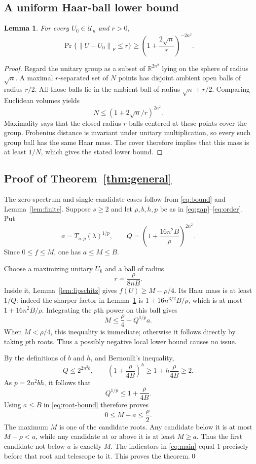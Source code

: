 \documentclass[11pt]{article}
\newcommand{\U}{\mathcal U}
\newcommand{\R}{\mathbb R}
\newcommand{\norm}[1]{\left\lVert#1\right\rVert}
\newtheorem{lemma}[theorem]{Lemma}
\theoremstyle{definition}\newtheorem{definition}[theorem]{Definition}
\theoremstyle{remark}\newtheorem{remark}[theorem]{Remark}
\begin{document}
\subsection{A uniform Haar-ball lower bound}
\begin{lemma}\label{lem:ball}
For every $U_0\in\U_n$ and $r>0$,
\[
 \Pr\{\norm{U-U_0}_F\leq r\}
 \geq\left(1+\frac{2\sqrt n}{r}\right)^{-2n^2}.
\]
\end{lemma}
\begin{proof}
Regard the unitary group as a subset of $\R^{2n^2}$ lying on the sphere of radius $\sqrt n$. A maximal $r$-separated set of $N$ points has disjoint ambient open balls of radius $r/2$. All those balls lie in the ambient ball of radius $\sqrt n+r/2$. Comparing Euclidean volumes yields
\[
 N\leq(1+2\sqrt n/r)^{2n^2}.
\]
Maximality says that the closed radius-$r$ balls centered at these points cover the group. Frobenius distance is invariant under unitary multiplication, so every such group ball has the same Haar mass. The cover therefore implies that this mass is at least $1/N$, which gives the stated lower bound.
\end{proof}

\subsection{Proof of Theorem~\ref{thm:general}}
The zero-spectrum and single-candidate cases follow from \eqref{eq:bound} and Lemma~\ref{lem:finite}. Suppose $s\geq2$ and let $\rho,b,h,p$ be as in \eqref{eq:gap}--\eqref{eq:order}. Put
\[
 a=T_{n,p}(\lambda)^{1/p},\qquad
 Q=\left(1+\frac{16n^2B}{\rho}\right)^{2n^2}.
\]
Since $0\leq f\leq M$, one has $a\leq M\leq B$.

Choose a maximizing unitary $U_0$ and a ball of radius
\[
 r=\frac{\rho}{8nB}.
\]
Inside it, Lemma~\ref{lem:lipschitz} gives $f(U)\geq M-\rho/4$. Its Haar mass is at least $1/Q$: indeed the sharper factor in Lemma~\ref{lem:ball} is $1+16n^{3/2}B/\rho$, which is at most $1+16n^2B/\rho$. Integrating the $p$th power on this ball gives
\begin{equation}\label{eq:root-bound}
 M\leq\frac\rho4+Q^{1/p}a.
\end{equation}
When $M<\rho/4$, this inequality is immediate; otherwise it follows directly by taking $p$th roots. Thus a possibly negative local lower bound causes no issue.

By the definitions of $b$ and $h$, and Bernoulli's inequality,
\[
 Q\leq 2^{2n^2b},\qquad
 \left(1+\frac\rho{4B}\right)^h
 \geq1+h\frac\rho{4B}\geq2.
\]
As $p=2n^2bh$, it follows that
\[
 Q^{1/p}\leq1+\frac\rho{4B}.
\]
Using $a\leq B$ in \eqref{eq:root-bound} therefore proves
\begin{equation}\label{eq:half-gap}
 0\leq M-a\leq\frac\rho2.
\end{equation}
The maximum $M$ is one of the candidate roots. Any candidate below it is at most $M-\rho<a$, while any candidate at or above it is at least $M\geq a$. Thus the first candidate not below $a$ is exactly $M$. The indicators in \eqref{eq:main} equal $1$ precisely before that root and telescope to it. This proves the theorem.\qed
\end{document}
